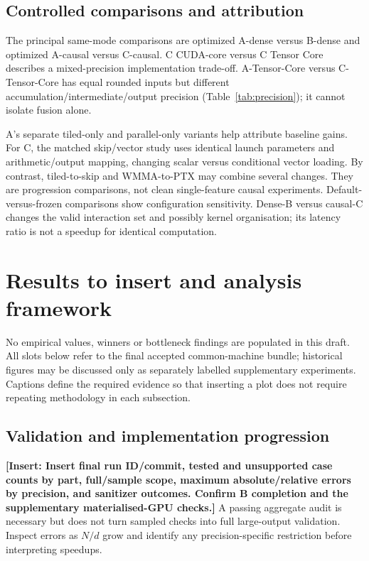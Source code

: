 \documentclass[11pt,a4paper]{article}
\newcommand{\pending}[1]{\textcolor{draftblue}{\textbf{[Insert: #1]}}}
\begin{document}
\subsection{Controlled comparisons and attribution}
The principal same-mode comparisons are optimized A-dense versus B-dense and
optimized A-causal versus C-causal. C CUDA-core versus C Tensor Core describes
a mixed-precision implementation trade-off. A-Tensor-Core versus C-Tensor-Core
has equal rounded inputs but different accumulation/intermediate/output precision
(Table~\ref{tab:precision}); it cannot isolate fusion alone.

A's separate tiled-only and parallel-only variants help attribute baseline gains.
For C, the matched skip/vector study uses identical launch parameters and
arithmetic/output mapping, changing scalar versus conditional vector loading.
By contrast, tiled-to-skip and WMMA-to-PTX may combine several changes. They
are progression comparisons, not clean single-feature causal experiments.
Default-versus-frozen comparisons show configuration sensitivity. Dense-B versus
causal-C changes the valid interaction set and possibly kernel organisation;
its latency ratio is not a speedup for identical computation.

\section{Results to insert and analysis framework}\label{sec:results}
No empirical values, winners or bottleneck findings are populated in this draft.
All slots below refer to the final accepted common-machine bundle; historical
figures may be discussed only as separately labelled supplementary experiments.
Captions define the required evidence so that inserting a plot does not require
repeating methodology in each subsection.

\subsection{Validation and implementation progression}
\pending{Insert final run ID/commit, tested and unsupported case counts by part,
full/sample scope, maximum absolute/relative errors by precision, and sanitizer
outcomes. Confirm B completion and the supplementary materialised-GPU checks.}
A passing aggregate audit is necessary but does not turn sampled checks into
full large-output validation. Inspect errors as $N/d$ grow and identify any
precision-specific restriction before interpreting speedups.
\end{document}
